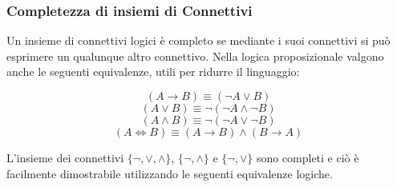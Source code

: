 \documentclass[a4paper,12pt, oneside]{book}
\begin{document}
\subsubsection{Completezza di insiemi di Connettivi}
Un insieme di connettivi logici è completo se mediante i suoi connettivi si può
esprimere un qualunque altro connettivo.
Nella logica proposizionale valgono anche le seguenti equivalenze, utili per
ridurre il linguaggio: 

\[(A \rightarrow B)  \equiv  (\neg A \lor B) \]
\[(A \lor B)  \equiv  \neg(\neg A \land \neg B) \]
\[(A \land B)  \equiv  \neg(\neg A \lor \neg B) \]
\[(A \iff B) \equiv  (A \rightarrow B) \land (B \rightarrow A) \]



L'insieme dei connettivi $\{ \neg,\lor,\land \}$, $\{ \neg,\land \}$ e $\{
\neg,\lor \}$ sono completi 
e ciò è facilmente dimostrabile utilizzando le seguenti equivalenze logiche.
\newpage
\end{document}
